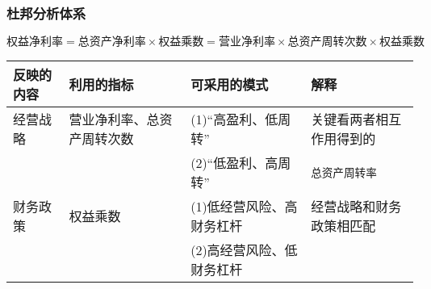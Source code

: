 \documentclass[11pt]{article}
\begin{document}
\subsubsection{杜邦分析体系}
\label{sec:org37cdb8a}
\(权益净利率 = 总资产净利率\times 权益乘数 = 营业净利率\times 总资产周转次数 \times 权益乘数\)
\begin{center}
\begin{tabular}{llll}
反映的内容 & 利用的指标 & 可采用的模式 & 解释\\
\hline
经营战略 & 营业净利率、总资产周转次数 & (1)``高盈利、低周转'' & 关键看两者相互作用得到的\\
 &  & (2)``低盈利、高周转'' & \texttt{总资产周转率}\\
\hline
财务政策 & 权益乘数 & (1)低经营风险、高财务杠杆 & 经营战略和财务政策相匹配\\
 &  & (2)高经营风险、低财务杠杆 & \\
\end{tabular}
\end{center}
\end{document}
